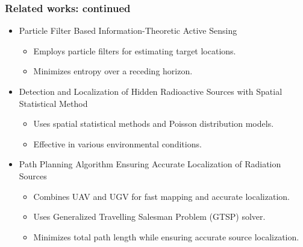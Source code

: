 \documentclass[aspectratio=169]{beamer}
\begin{document}
\begin{frame}
\frametitle{Related works: continued}
\begin{itemize}
  \item Particle Filter Based Information-Theoretic Active Sensing \cite{ryan2010particle}
  \begin{itemize}
    \item Employs particle filters for estimating target locations.
    \item Minimizes entropy over a receding horizon.
  \end{itemize}
  \item Detection and Localization of Hidden Radioactive Sources with Spatial Statistical Method \cite{wan2012detection}
  \begin{itemize}
    \item Uses spatial statistical methods and Poisson distribution models.
    \item Effective in various environmental conditions.
  \end{itemize}
  \item Path Planning Algorithm Ensuring Accurate Localization of Radiation Sources \cite{woller2022path}
  \begin{itemize}
    \item Combines UAV and UGV for fast mapping and accurate localization.
    \item Uses Generalized Travelling Salesman Problem (GTSP) solver.
    \item Minimizes total path length while ensuring accurate source localization.
  \end{itemize}


\end{itemize}
\end{frame}
\end{document}

